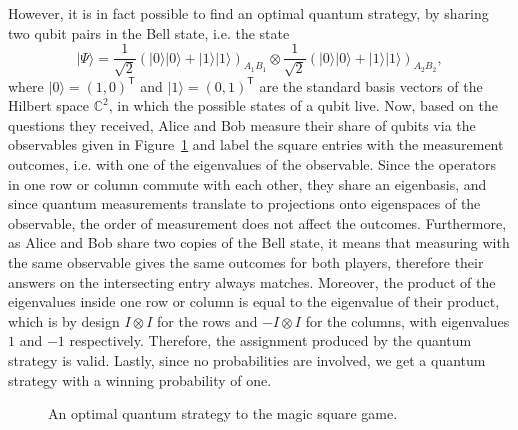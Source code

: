 However, it is in fact possible to find an optimal quantum strategy, by sharing two qubit pairs in the Bell state,
i.e. the state 
\[ |\Psi\rangle = \frac{1}{\sqrt{2}} \left(|0\rangle |0\rangle + |1\rangle|1\rangle \right)_{A_1 B_1} \otimes \frac{1}{\sqrt{2}}\left(|0\rangle |0\rangle + |1\rangle|1\rangle \right)_{A_2 B_2}, \]
where $|0\rangle = (1, 0)^\textsf{T}$ and $|1\rangle = (0, 1)^\textsf{T}$ are the standard basis vectors of the Hilbert space $\mathbb{C}^2$,
in which the possible states of a qubit live.
Now, based on the questions they received, Alice and Bob measure their share of qubits via the observables given
in Figure~\ref{fig:quantum-magic-square} and label the square entries with the measurement outcomes,
i.e. with one of the eigenvalues of the observable.
Since the operators in one row or column commute with each other, they share an eigenbasis,
and since quantum measurements translate to projections onto eigenspaces of the observable,
the order of measurement does not affect the outcomes.
Furthermore, as Alice and Bob share two copies of the Bell state, it means that measuring with 
the same observable gives the same outcomes for both players, therefore their answers 
on the intersecting entry always matches. 
Moreover, the product of the eigenvalues inside one row or column is equal to the eigenvalue
of their product, which is by design $I\otimes I$ for the rows and $-I\otimes I$ for the columns,
with eigenvalues $1$ and $-1$ respectively.
Therefore, the assignment produced by the quantum strategy is valid.
Lastly, since no probabilities are involved, we get a quantum strategy with a winning probability of one.
\begin{figure}[h]
    \centering
    \caption{An optimal quantum strategy to the magic square game.}\label{fig:quantum-magic-square}
\end{figure}

